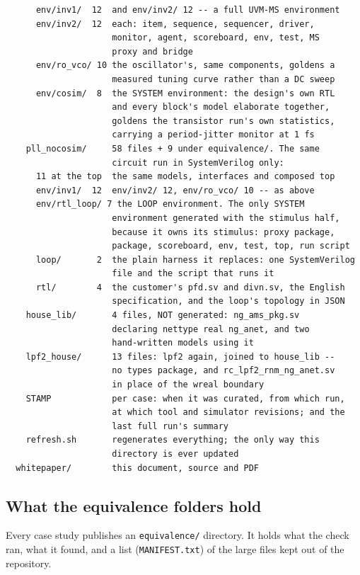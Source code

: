 \documentclass[11pt,a4paper]{article}
\begin{document}
\begin{lstlisting}
      env/inv1/  12  and env/inv2/ 12 -- a full UVM-MS environment
      env/inv2/  12  each: item, sequence, sequencer, driver,
                     monitor, agent, scoreboard, env, test, MS
                     proxy and bridge
      env/ro_vco/ 10 the oscillator's, same components, goldens a
                     measured tuning curve rather than a DC sweep
      env/cosim/  8  the SYSTEM environment: the design's own RTL
                     and every block's model elaborate together,
                     goldens the transistor run's own statistics,
                     carrying a period-jitter monitor at 1 fs
    pll_nocosim/     58 files + 9 under equivalence/. The same
                     circuit run in SystemVerilog only:
      11 at the top  the same models, interfaces and composed top
      env/inv1/  12  env/inv2/ 12, env/ro_vco/ 10 -- as above
      env/rtl_loop/ 7 the LOOP environment. The only SYSTEM
                     environment generated with the stimulus half,
                     because it owns its stimulus: proxy package,
                     package, scoreboard, env, test, top, run script
      loop/       2  the plain harness it replaces: one SystemVerilog
                     file and the script that runs it
      rtl/        4  the customer's pfd.sv and divn.sv, the English
                     specification, and the loop's topology in JSON
    house_lib/       4 files, NOT generated: ng_ams_pkg.sv
                     declaring nettype real ng_anet, and two
                     hand-written models using it
    lpf2_house/      13 files: lpf2 again, joined to house_lib --
                     no types package, and rc_lpf2_rnm_ng_anet.sv
                     in place of the wreal boundary
    STAMP            per case: when it was curated, from which run,
                     at which tool and simulator revisions; and the
                     last full run's summary
    refresh.sh       regenerates everything; the only way this
                     directory is ever updated
  whitepaper/        this document, source and PDF
\end{lstlisting}

\subsection{What the equivalence folders hold}

Every case study publishes an \texttt{equivalence/} directory. It
holds what the check ran, what it found, and a list
(\texttt{MANIFEST.txt}) of the large files kept out of the
repository.
\end{document}
